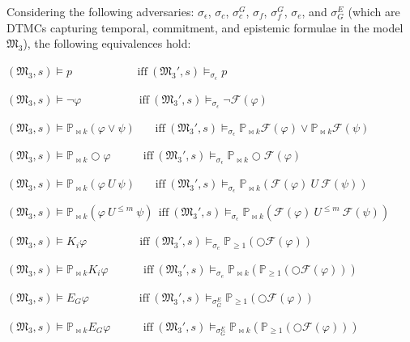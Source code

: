 \begin{theorem}\label{theorem:transf-satisf} \hspace{0.5cm}

Considering the following adversaries: $\sigma_\epsilon$, $\sigma_c$, $\sigma_c^G$, $\sigma_f$, $\sigma_f^G$, $\sigma_e$, and $\sigma_G^E$ (which are DTMCs capturing temporal, commitment, and epistemic formulae in the model $\mathfrak{M_3}$), the following equivalences hold:

$(\mathfrak{M_3},s)\models p ~~~~~~~~~~~~~~~~~~~~~~~~~~\text{iff}~ (\mathfrak{M_3'},s) \models_{\sigma_\epsilon} p$

$(\mathfrak{M_3},s)\models \neg \varphi ~~~~~~~~~~~~~~~~~~~~~~~\text{iff}~ (\mathfrak{M_3'},s)\models_{\sigma_\epsilon} \neg \mathscr{F}(\varphi)$

$(\mathfrak{M_3},s)\models \mathbb{P}_{\bowtie k}(\varphi \vee \psi)
~~~~~~~~\text{iff}~ (\mathfrak{M_3'},s) \models_{\sigma_\epsilon}
\mathbb{P}_{\bowtie k} \mathscr{F}(\varphi) \vee
\mathbb{P}_{\bowtie k} \mathscr{F}(\psi) $

$(\mathfrak{M_3},s)\models \mathbb{P}_{\bowtie k}\bigcirc\varphi ~~~~~~~~~~~~~\text{iff}~ (\mathfrak{M_3'},s) \models_{\sigma_\epsilon} \mathbb{P}_{\bowtie k} \bigcirc \mathscr{F}(\varphi)$

$(\mathfrak{M_3},s)\models\mathbb{P}_{\bowtie k}(\varphi~ U ~ \psi) ~~~~~~~~\text{iff}~ (\mathfrak{M_3'},s) \models_{\sigma_\epsilon} \mathbb{P}_{\bowtie k}(\mathscr{F}(\varphi)~ U ~\mathscr{F}(\psi))$

$(\mathfrak{M_3},s)\models\mathbb{P}_{\bowtie k}(\varphi~ U^{\leq m} ~ \psi) ~~\text{iff}~ (\mathfrak{M_3'},s) \models_{\sigma_\epsilon} \mathbb{P}_{\bowtie k}(\mathscr{F}(\varphi)~ U^{\leq m} ~\mathscr{F}(\psi))$

$(\mathfrak{M_3},s)\models K_i \varphi ~~~~~~~~~~~~~~~~~~~~~\text{iff}~ (\mathfrak{M_3'},s)\models_{\sigma_e} \mathbb{P}_{\geq1}(\bigcirc\mathscr{F}(\varphi))$

$(\mathfrak{M_3},s)\models \mathbb{P}_{\bowtie k}K_i \varphi ~~~~~~~~~~~~~~\text{iff}~ (\mathfrak{M_3'},s) \models_{\sigma_e} \mathbb{P}_{\bowtie k}(\mathbb{P}_{\geq1}(\bigcirc\mathscr{F}(\varphi)))$

$(\mathfrak{M_3},s)\models E_G \varphi ~~~~~~~~~~~~~~~~~~~~\text{iff}~ (\mathfrak{M_3'},s)\models_{\sigma_G^E} \mathbb{P}_{\geq1}(\bigcirc\mathscr{F}(\varphi))$

$(\mathfrak{M_3},s)\models \mathbb{P}_{\bowtie k}E_G \varphi ~~~~~~~~~~~~~\text{iff}~ (\mathfrak{M_3'},s) \models_{\sigma_G^E} \mathbb{P}_{\bowtie k}(\mathbb{P}_{\geq1}(\bigcirc\mathscr{F}(\varphi)))$


\end{theorem}
